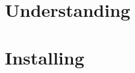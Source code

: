 \documentclass[a4paper,12pt]{book}
\begin{document}
\frontmatter




\mainmatter
\part{Understanding}



\part{Installing}


\appendix



\backmatter
%

\end{document}
